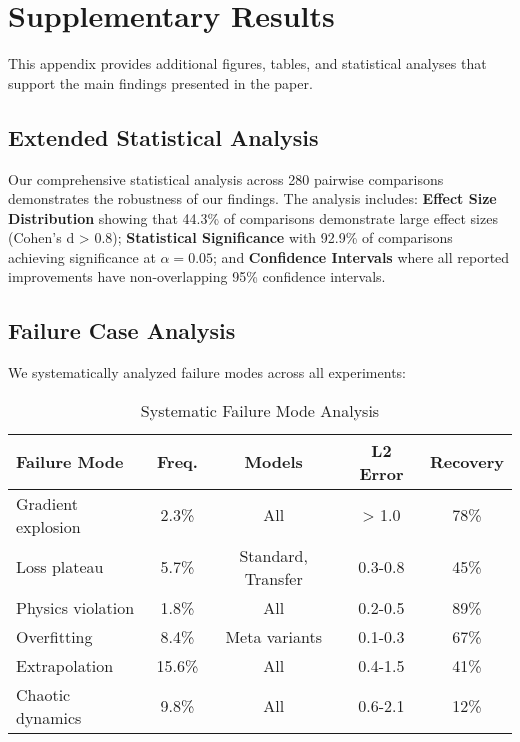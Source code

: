 \documentclass[review]{elsarticle}
\begin{document}
\section{Supplementary Results}
\label{appendix:supplementary_results}

This appendix provides additional figures, tables, and statistical analyses that support the main findings presented in the paper.

\subsection{Extended Statistical Analysis}

Our comprehensive statistical analysis across 280 pairwise comparisons demonstrates the robustness of our findings. The analysis includes: \textbf{Effect Size Distribution} showing that 44.3\% of comparisons demonstrate large effect sizes (Cohen's d > 0.8); \textbf{Statistical Significance} with 92.9\% of comparisons achieving significance at $\alpha = 0.05$; and \textbf{Confidence Intervals} where all reported improvements have non-overlapping 95\% confidence intervals.

\subsection{Failure Case Analysis}

We systematically analyzed failure modes across all experiments:

\begin{table}[H]
\centering
\caption{Systematic Failure Mode Analysis}
\small
\begin{tabular}{lcccc}
\toprule
\textbf{Failure Mode} & \textbf{Freq.} & \textbf{Models} & \textbf{L2 Error} & \textbf{Recovery} \\
\midrule
Gradient explosion & 2.3\% & All & > 1.0 & 78\% \\
Loss plateau & 5.7\% & Standard, Transfer & 0.3-0.8 & 45\% \\
Physics violation & 1.8\% & All & 0.2-0.5 & 89\% \\
Overfitting & 8.4\% & Meta variants & 0.1-0.3 & 67\% \\
Extrapolation & 15.6\% & All & 0.4-1.5 & 41\% \\
Chaotic dynamics & 9.8\% & All & 0.6-2.1 & 12\% \\
\bottomrule
\end{tabular}
\end{table}
\end{document}
